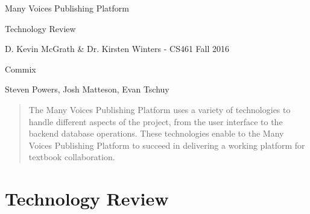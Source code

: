 \documentclass[letterpaper, 10pt, draftclsnofoot, compsoc, onecolumn]{IEEEtran}
\begin{document}
\begin{titlepage}
\centering
{\huge Many Voices Publishing Platform\par}
{\LARGE Technology Review\par}
{\vspace{5mm}}
{\large D. Kevin McGrath \& Dr. Kirsten Winters -  CS461 Fall 2016\par}
{\large Commix\par}
{\large Steven Powers, Josh Matteson, Evan Tschuy\par}
{\vspace{10mm}}

\begin{abstract}
\noindent The Many Voices Publishing Platform uses a variety of technologies to handle different aspects of the project, from the user interface to the backend database operations. These technologies enable to the Many Voices Publishing Platform to succeed in delivering a working platform for textbook collaboration. 
\end{abstract}

\end{titlepage}

\tableofcontents

\newpage

\setcounter{page}{1}\pagestyle{fancy}

\vspace{1pc}
\section{Technology Review}
\end{document}
